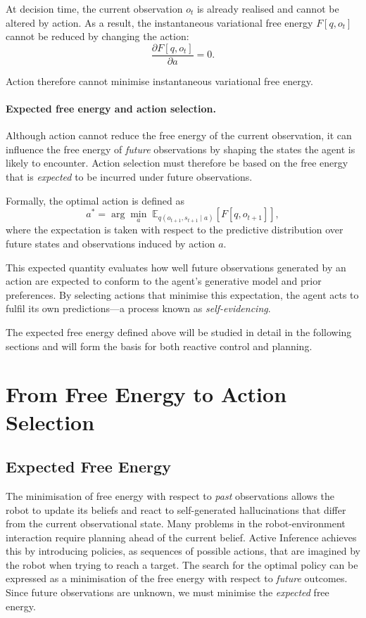 \documentclass[a4paper, twoside]{article}
\begin{document}
At decision time, the current observation $o_t$ is already realised and cannot
be altered by action. As a result, the instantaneous variational free energy
$F[q,o_t]$ cannot be reduced by changing the action:
\begin{equation}
\frac{\partial F[q,o_t]}{\partial a} = 0 .
\end{equation}

Action therefore cannot minimise instantaneous variational free energy.

\paragraph{Expected free energy and action selection.}
Although action cannot reduce the free energy of the current observation, it can
influence the free energy of \emph{future} observations by shaping the states the
agent is likely to encounter. Action selection must therefore be based on the
free energy that is \emph{expected} to be incurred under future observations.

Formally, the optimal action is defined as
\begin{equation}
a^\ast
=
\arg\min_a
\;
\mathbb{E}_{q(o_{t+1}, s_{t+1} \mid a)}
\left[
F[q, o_{t+1}]
\right],
\end{equation}
where the expectation is taken with respect to the predictive distribution over
future states and observations induced by action $a$.

This expected quantity evaluates how well future observations generated by an
action are expected to conform to the agent’s generative model and prior
preferences. By selecting actions that minimise this expectation, the agent acts
to fulfil its own predictions—a process known as \emph{self-evidencing}.

The expected free energy defined above will be studied in detail in the
following sections and will form the basis for both reactive control and
planning.


\section{From Free Energy to Action Selection}\label{section:from_energy_to_action_selection}

\subsection{Expected Free Energy}
The minimisation of free energy with respect to \textit{past} observations allows the robot to update its beliefs and react to self-generated hallucinations that differ from the current observational state. 
Many problems in the robot-environment interaction require planning ahead of the current belief. 
Active Inference achieves this by introducing policies, as sequences of possible actions, that are imagined by the robot when trying to reach a target. 
The search for the optimal policy can be expressed as a minimisation of the free energy with respect to \textit{future} outcomes. Since future observations are unknown, we must minimise the \textit{expected} free energy.
\end{document}
